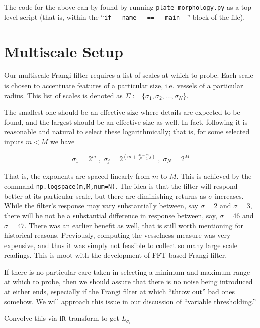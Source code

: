 	The code for the above can by found by running \texttt{plate\_morphology.py} as a top-level script (that is, within the ``\texttt{if \_\_name\_\_ == \_\_main\_\_}'' block of the file).
\section{Multiscale Setup}

	Our multiscale Frangi filter requires a list of scales at which to probe. Each scale is chosen to accentuate features of a particular size, i.e. vessels of a particular radius. This  list of scales is denoted as $\Sigma := \{ \sigma_1, \sigma_2, \dots, \sigma_N\}$. 
	 
	The smallest one should be an effective size where details are expected to be found, and the largest should be an effective size as well. In fact, following \cite{Koenderink} it is reasonable and natural to select these logarithmically; that is,
	for some selected inputs $m < M$ we have
	
	\begin{equation}
	\sigma_1 = 2^{m} \; , \; \sigma_{j} = 2^{\left(m+\frac{M-m}{N-1}j\right)} \; , \; \sigma_N = 2^{M} \end{equation}
	
	That is, the exponents are spaced linearly from $m$ to $M$. This is achieved by the command
	\texttt{np.logspace(m,M,num=N)}. The idea is that the filter will respond better at its particular scale, but there are diminishing returns as $\sigma$ increases. While the filter's response may vary substantially between, say $\sigma=2$ and $\sigma=3$, there will be not be a substantial difference in response between, say, $\sigma=46$ and $\sigma=47$. There was an earlier benefit as well, that is still worth mentioning for historical reasons. Previously, computing the vesselness measure was very expensive, and thus it was simply not feasible to collect so many large scale readings. This is moot with the development of FFT-based Frangi filter.
	
	If there is no particular care taken in selecting a minimum and maximum range at which to probe, then we should assure that there is no noise being introduced at either ends, especially if the Frangi filter at which   ``throw out'' bad ones somehow. We will approach this issue in our discussion of ``variable thresholding.''
	
	
	
	
	
	Convolve this via fft transform to get $L_{\sigma_i}$
	

